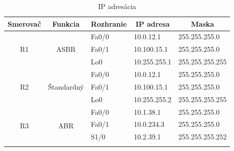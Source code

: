 \documentclass[12pt,twoside,a4paper]{article}
\begin{document}
\begin{table}[!htb]
\centering
\caption{IP adresácia}
\label{tab:ip_adresacia}
\begin{tabular}{|c|c|l|l|l|}
\hline
\multicolumn{1}{|c|}{\textbf{Smerovač}}    & \multicolumn{1}{c|}{\textbf{Funkcia}}                        & \multicolumn{1}{c|}{\textbf{Rozhranie}} & \multicolumn{1}{c|}{\textbf{IP adresa}} & \multicolumn{1}{c|}{\textbf{Maska}} \\ \hline
\multirow{3}{*}{R1}  & \multirow{3}{*}{ASBR}                   & Fa0/0                                   & 10.0.12.1                               & 255.255.255.0                       \\ \cline{3-5} 
                     &                                         & Fa0/1                                   & 10.100.15.1                             & 255.255.255.0                       \\ \cline{3-5} 
                     &                                         & Lo0                                     & 10.255.255.1                            & 255.255.255.255                     \\ \hline
\multirow{3}{*}{R2}  & \multirow{3}{*}{Štandardný}             & Fa0/0                                   & 10.0.12.1                               & 255.255.255.0                       \\ \cline{3-5} 
                     &                                         & Fa0/1                                   & 10.100.15.1                             & 255.255.255.0                       \\ \cline{3-5} 
                     &                                         & Lo0                                     & 10.255.255.2                            & 255.255.255.255                     \\ \hline
\multirow{4}{*}{R3}  & \multirow{4}{*}{ABR}                    & Fa0/0                                   & 10.1.38.1                               & 255.255.255.0                       \\ \cline{3-5} 
                     &                                         & Fa0/1                                   & 10.0.234.3                              & 255.255.255.0                       \\ \cline{3-5} 
                     &                                         & S1/0                                    & 10.2.39.1                               & 255.255.255.252                     \\ \cline{3-5} 

\end{tabular}
\end{table}
\end{document}
